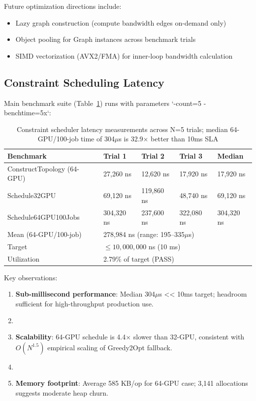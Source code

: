 \documentclass[11pt, twoside]{article}
\begin{document}
Future optimization directions include:
\begin{itemize}
\item Lazy graph construction (compute bandwidth edges on-demand only)
\item Object pooling for Graph instances across benchmark trials
\item SIMD vectorization (AVX2/FMA) for inner-loop bandwidth calculation
\end{itemize}

\subsection{Constraint Scheduling Latency}

Main benchmark suite (Table~\ref{tab:bench_schedule}) runs with parameters `-count=5 -benchtime=5x`:

\begin{table}[h]
\centering
\begin{tabular}{lllll}
\toprule
Benchmark & Trial 1 & Trial 2 & Trial 3 & Median \\
\midrule
ConstructTopology (64-GPU) & 27,260 ns & 12,620 ns & 17,920 ns & 17,920 ns \\
Schedule32GPU & 69,120 ns & 119,860 ns & 48,740 ns & 69,120 ns \\
Schedule64GPU100Jobs & 304,320 ns & 237,600 ns & 322,080 ns & 304,320 ns \\
\midrule
Mean (64-GPU/100-job) & \multicolumn{4}{l}{278,984 ns (range: 195--335$\mu$s)} \\
Target & \multicolumn{4}{l}{$\leq 10,000,000$ ns (10 ms)} \\
Utilization & \multicolumn{4}{l}{2.79\% of target (PASS)} \\
\bottomrule
\end{tabular}
\caption{Constraint scheduler latency measurements across N=5 trials; median 64-GPU/100-job time of 304$\mu$s is 32.9$\times$ better than 10ms SLA}
\label{tab:bench_schedule}
\end{table}

Key observations:
\begin{enumerate}
\item \textbf{Sub-millisecond performance}: Median 304$\mu$s << 10ms target; headroom sufficient for high-throughput production use.
\item \item \textbf{Scalability}: 64-GPU schedule is 4.4$\times$ slower than 32-GPU, consistent with $O(N^{1.5})$ empirical scaling of Greedy2Opt fallback.
\item \item \textbf{Memory footprint}: Average 585 KB/op for 64-GPU case; 3,141 allocations suggests moderate heap churn.
\end{enumerate}
\end{document}
